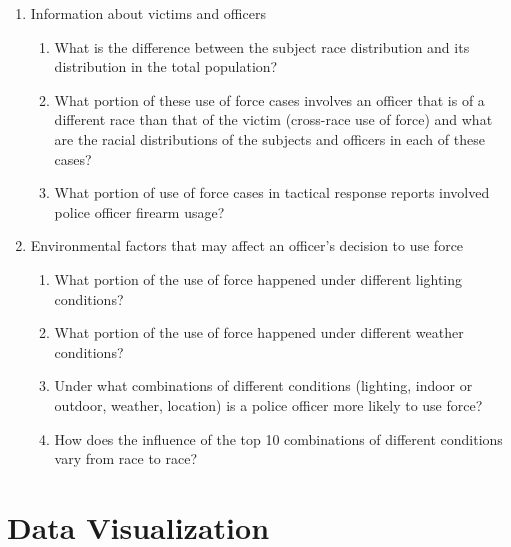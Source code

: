 \documentclass[10pt]{article}
\begin{document}
\begin{enumerate}

\item Information about victims and officers

    \begin{enumerate}

    \item What is the difference between the subject race distribution and its distribution in the total population?

    \item What portion of these use of force cases involves an officer that is of a different race than that of the victim (cross-race use of force) and what are the racial distributions of the subjects and officers in each of these cases?

    \item What portion of use of force cases in tactical response reports involved police officer firearm usage?

    \end{enumerate}

\item Environmental factors that may affect an officer's decision to use force

    \begin{enumerate}

    \item What portion of the use of force happened under different lighting conditions?

    \item What portion of the use of force happened under different weather conditions?

    \item Under what combinations of different conditions (lighting, indoor or outdoor, weather, location) is a police officer more likely to use force?

    \item How does the influence of the top 10 combinations of different conditions vary from race to race?

    \end{enumerate}

\end{enumerate}





\section{Data Visualization}
\end{document}
